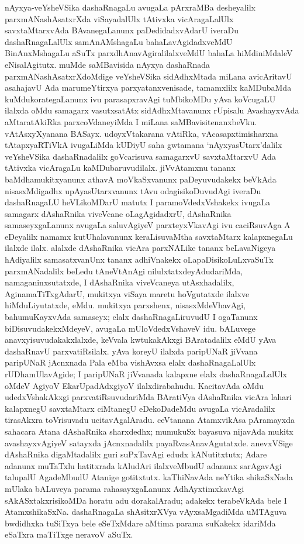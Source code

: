 nAyxya-veYsheVSika dashaRnagaLu avugaLa pArxraMBa desheyalilx parxmANashAsatxrXda viSaya\-dalUlx tAtivxka vicAragaLalUlx savxtaMtarxvAda BAvanegaLanunx paDedidadxvAdarU ive\-raDu dashaRnagaLalUlx samAnAMshagaLu bahaLavAgidadxveMdU BinAnxMshagaLu aSuTx parxdhAna\-vAgi\-ralilalxveMdU bahaLa hiMdiniMdaleV eNisalAgitutx. muMde saMBavi\-sida nAyxya dashaR\-nada parxmANashAsatxrXdoMdige veYsheVSika sidAdhxMtada miLana avicA\-ritavU asahajavU Ada marumeYtirxya parxyatanxvenisade, tamamxlilx kaMDubaMda kuMdukorate\-gaLanunx ivu para\-sapxravAgi tuMbikoMDu yAva koVcugaLU ilalxda oMdu samagarx vasutxsatAtx sidAdhxMta\-vanunx rUpisalu AvashayxvAda aMtaratAkiRka parxcoVdaneyiMda I miLana saMBavisi\-tenanxbeVku. vAtAsxyXyanana BASayx. udoyxVtakarana vAtiRka, vAcasapxtimisharxna tAtapxyaR\-TiVkA ivugaLiMda kUDiyU saha gwtamana `nAyxyasUtarx'dalilx veYsheVSika dashaRnadalilx goVcarisuva samagarxvU savxtaMtarxvU Ada tAtivxka vicAragaLu kaMDubaruvu\-dilalx. jiVvAtamxnu tananx baMdhamukitxyanunx athavA moVkaSxvanunx paDeyuvudakekx beVkAda nisasxMdigadhx upAyasUtarxvanunx tAvu odagisikoDuvudAgi iveraDu dashaRna\-gaLU heVLikoMDarU matutx I paramoV\-dedxVshakekx ivugaLa samagarx dAshaRnika viveV\-cane oLagAgidadxrU, dAshaRnika samaseyxgaLanunx avu\-gaLa saluvAgiyeV parxteyxVkavAgi ivu caciRsuvAga A eDeyalilx namamx kutUhala\-vanunx keraLi\-suvaMtha savxtaMtarx kalapxnegaLu ilalxde ilalx. alalxde dAshaRnika vicAra parxNA\-Like tananx beLavaNigeya hAdiyalilx samasatx\-vanUnx tananx adhiVnakekx oLapaDisikoLuLxvaSuTx parxmANa\-dalilx beLedu tAneVtAnAgi nilulxtatxdeyAdudariMda, namaganinxsutatxde, I dAshaRnika viveVcaneya utAsxhadalilx, AginamaTiTxgAdarU, mukitxya viSaya maretu hoVgutatxde ilalxve hiMduLiyutatxde, eMdu. mukitxya parxshenx, nisasxMdeVhavAgi, bahumuKayxvAda samaseyx; elalx dashaRnagaLiruvudU I oga\-Tanunx biDisuvudakekxMdeyeV, avugaLa mUloV\-dedxVshaveV idu. bALuvege anavxyisu\-vudakakxlalxde, keVvala kwtukakAkxgi BAratadalilx eMdU yAva dashaRnavU parxvatiRsilalx. yAva koreyU ilalxda paripUNaR jiVvana paripUNaR jAcnxnada Pala eMba vishAvxsa elalx dashaRnagaLalUlx rUDhamUlavAgide; I paripUNaR jiVvanada kalapxne elalx dashaRna\-gaLalUlx oMdeV AgiyoV EkarUpadAdxgiyoV ilalxdira\-bahudu. KacitavAda oMdu udedxVshakAkxgi parxvatiRsuvudariMda BAratiVya dAshaRnika vicAra lahari kalapxnegU savxtaMtarx ciMtanegU eDekoDadeMdu avugaLa vicAradalilx tira\-sAkxra toVrisuvadu ucita\-vAgalAradu. ceVtanana AtamxvikAsa pAramayxda sahacara Atana dAshaRnika sharxdedhx; mumukuSx bayasuva nijavAda mukitx avashayxvAgiyeV satayxda jAcnxna\-dalilx payaRvasAnavAgutatxde. anevxVSige dAshaRnika digaMtadalilx guri suPxTavAgi edudx kANutitxtutx; Adare adanunx \hbox{muTaTxlu} hatitxrada kAludAri ilalxveMbudU adanunx sarAga\-vAgi talupalU Aga\-deMbudU Atanige gotitxtutx. kaThiNavAda neYtika shikaSxNada \hbox{mUlaka} bALuveya parama rahasayxgaLanunx AdhAyxtimxkavAgi sAkASxtakxrisikoMDa horatu adu doraka\-lAradu; adakekx terabeVkAda bele I AtamxshikaSxNa. dashaRnagaLa shAsitxrXVya vAyxsaMga\-diMda uMTAguva \hbox{bwdidhxka} tuSiTxya bele eSeTxMdare aMtima parama suKakekx idariMda eSaTxra maTiTxge \hbox{neravoV} aSuTx.

